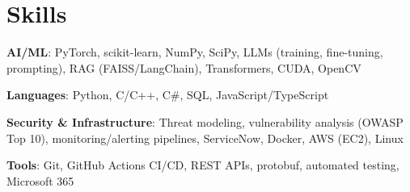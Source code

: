 \documentclass[letterpaper,10pt]{article}
\begin{document}
\section{Skills}
 \resumeSubHeadingListStart
   \item{
     \textbf{AI/ML}{: PyTorch, scikit-learn, NumPy, SciPy, LLMs (training, fine-tuning, prompting), RAG (FAISS/LangChain), Transformers, CUDA, OpenCV}
   }
   \item{
     \textbf{Languages}{: Python, C/C++, C\#, SQL, JavaScript/TypeScript}
   }
   \item{
     \textbf{Security \& Infrastructure}{: Threat modeling, vulnerability analysis (OWASP Top 10), monitoring/alerting pipelines, ServiceNow, Docker, AWS (EC2), Linux}
   }
   \item{
     \textbf{Tools}{: Git, GitHub Actions CI/CD, REST APIs, protobuf, automated testing, Microsoft 365}
   }
 \resumeSubHeadingListEnd

\end{document}
